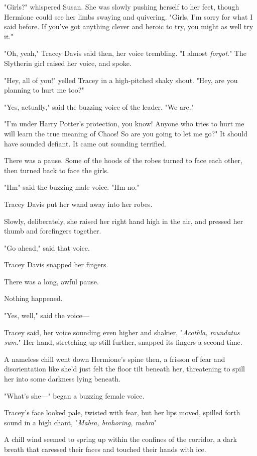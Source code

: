 "Girls?" whispered Susan. She was slowly pushing herself to her feet, though
Hermione could see her limbs swaying and quivering. "Girls, I'm sorry for what
I said before. If you've got anything clever and heroic to try, you might as
well try it."

"Oh, yeah," Tracey Davis said then, her voice trembling. "I almost
\emph{forgot}." The Slytherin girl raised her voice, and spoke.

"Hey, all of you!" yelled Tracey in a high-pitched shaky shout. "Hey, are you
planning to hurt me too?"

"Yes, actually," said the buzzing voice of the leader. "We are."

"I'm under Harry Potter's protection, you know! Anyone who tries to hurt me
will learn the true meaning of Chaos! So are you going to let me go?" It should
have sounded defiant. It came out sounding terrified.

There was a pause. Some of the hoods of the robes turned to face each other,
then turned back to face the girls.

"Hm{\el}" said the buzzing male voice. "Hm{\el} no."

Tracey Davis put her wand away into her robes.

Slowly, deliberately, she raised her right hand high in the air, and pressed
her thumb and forefingers together.

"Go ahead," said that voice.

Tracey Davis snapped her fingers.

There was a long, awful pause.

Nothing happened.

"Yes, well," said the voice—

Tracey said, her voice sounding even higher and shakier, "\emph{Acathla,
mundatus sum}." Her hand, stretching up still further, snapped its fingers a
second time.

A nameless chill went down Hermione's spine then, a frisson of fear and
disorientation like she'd just felt the floor tilt beneath her, threatening to
spill her into some darkness lying beneath.

"What's she—" began a buzzing female voice.

Tracey's face looked pale, twisted with fear, but her lips moved, spilled forth
sound in a high chant, "\emph{Mabra, brahoring, mabra{\el}}"

A chill wind seemed to spring up within the confines of the corridor, a dark
breath that caressed their faces and touched their hands with ice.

